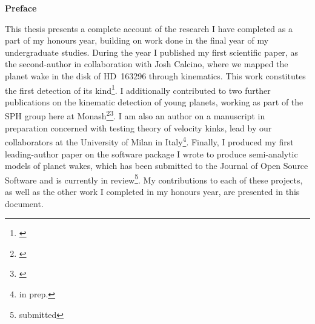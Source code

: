 {}

\begin{center}
    
    {\Large \textbf{Preface}}
    
\end{center}

\noindent This thesis presents a complete account of the research I have completed as a part of my honours year, building on work done in the final year of my undergraduate studies.
During the year I published my first scientific paper, as the second-author in collaboration with Josh Calcino, where we mapped the planet wake in the disk of HD~163296 through kinematics.
This work constitutes the first detection of its kind\footnote{\citealt{calcino2022}}. 
I additionally contributed to two further publications on the kinematic detection of young planets, working as part of the SPH group here at Monash\footnote{\citealt{verrios2022}}\footnote{\citealt{garg2022}}.
I am also an author on a manuscript in preparation concerned with testing theory of velocity kinks, lead by our collaborators at the University of Milan in Italy\footnote{\citeauthor{fasanoinprep.} in prep.}.
Finally, I produced my first leading-author paper on the software package I wrote to produce semi-analytic models of planet wakes, which has been submitted to the Journal of Open Source Software and is currently in review\footnote{\citeauthor{hildersubmitted} submitted}.
My contributions to each of these projects, as well as the other work I completed in my honours year, are presented in this document.


\newpage